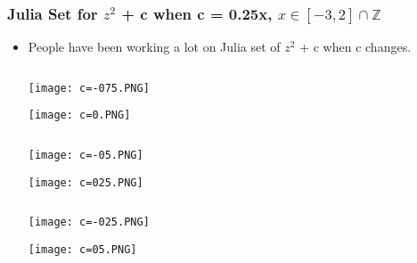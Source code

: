 \documentclass[leqno,handout]{beamer}
\begin{document}
\begin{frame} 

    
\frametitle{Julia Set for $z^{2}$ + c when c = 0.25x, $x\in [-3,2] \cap \mathbb{Z}$} 

\begin{itemize}

\item  People have been working a lot on Julia set of $z^{2}$ + c when c changes.

\begin{column}{0.3\textwidth}
      	\begin{center}
        \texttt{[image: c=-075.PNG]}
        \end{center}
        \begin{center}
        \texttt{[image: c=0.PNG]}
        \end{center}
\end{column}
\begin{column}{0.3\textwidth}
      	\begin{center}
        \texttt{[image: c=-05.PNG]}
        \end{center}
        \begin{center}
        \texttt{[image: c=025.PNG]}
        \end{center}
\end{column}
\begin{column}{0.3\textwidth}
      	\begin{center}
        \texttt{[image: c=-025.PNG]}
        \end{center}
        	\begin{center}
        \texttt{[image: c=05.PNG]}
        \end{center}
\end{column}

\end{itemize}
\end{frame}
\end{document}

